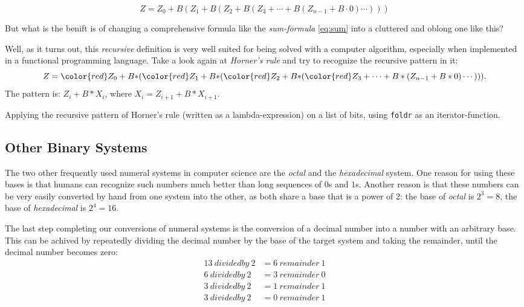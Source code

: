 \begin{equation} \label{eq:horner}
\boxed{Z=Z_0+B(Z_1+B(Z_2+B(Z_3+\cdots+B(Z_{n-1}+B\cdot0)\cdots)))}
\end{equation}

But what is the benift is of changing a comprehensive formula like the \emph{sum-formula} \eqref{eq:sum} into a cluttered and oblong one like this?

Well, as it turns out, this \emph{recursive} definition is very well suited for being solved with a computer algorithm, especially when implemented in a functional programming language.
Take a look again at \emph{Horner's rule} and try to recognize the recursive pattern in it:
\begin{equation*}
Z={\color{red}Z_0+B*}({\color{red}Z_1+B*}({\color{red}Z_2+B*}({\color{red}Z_3}+\cdots+B*(Z_{n-1}+B*0)\cdots))).
\end{equation*}
The pattern is: $Z_i + B * X_i$, where $X_i = Z_{i+1} + B * X_{i+1}$.

\begin{impl}
Applying the recursive pattern of Horner's rule (written as a lambda-expression) on a list of bits, using \texttt{foldr} as an iterator-function. 
\end{impl}


\subsection{Other Binary Systems}

The two other frequently used numeral systems in computer science are the \emph{octal} and the \emph{hexadecimal} system.
One reason for using these bases is that humans can recognize such numbers much better than long sequences of $0$s and $1$s.
Another reason is that these numbers can be very easily converted by hand from one system into the other, as both share a base that is a power of 2: the base of \emph{octal} is $2^3=8$, the base of \emph{hexadecimal} is $2^4=16$.

The last step completing our conversions of numeral systems is the conversion of a decimal number into a number with an arbitrary base.
This can be achived by repeatedly dividing the decimal number by the base of the target system and
taking the remainder, until the decimal number becomes zero:
\begin{align*}
    13 \ divided by \ 2 &= 6 \ remainder \ 1 \\
     6 \ divided by \ 2 &= 3 \ remainder \ 0 \\
     3 \ divided by \ 2 &= 1 \ remainder \ 1 \\
     3 \ divided by \ 2 &= 0 \ remainder \ 1
\end{align*}

